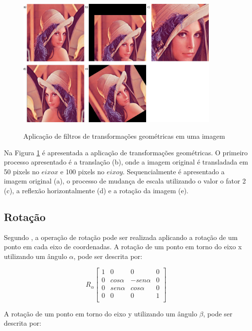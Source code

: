 \documentclass[
	12pt,				%
	oneside,			%
	a4paper,			%
	english,			%
	french,				%
	spanish,			%
	brazil,				%
	]{abntex2}
\begin{document}
\begin{figure}[ht]
\centering
\caption{Aplicação de filtros de transformações geométricas em uma imagem}
\includegraphics[width=0.9\textwidth]{imagens/transformacoesgeometricas.png}
\sourceAuthor
\label{fig:transformacoesgeometricas}
\end{figure}

Na Figura \ref{fig:transformacoesgeometricas} é apresentada a aplicação de transformações geométricas. O primeiro processo apresentado é a translação (b), onde a imagem original é transladada em 50 pixels no \(eixo x\) e 100 pixels no \(eixo y\). Sequencialmente é apresentado a imagem original (a), o processo de mudança de escala utilizando o valor o fator 2 (c), a reflexão horizontalmente (d) e a rotação da imagem (e). 

\subsection{Rotação}

Segundo \citet{pedriniSchwartz:2008}, a operação de rotação pode ser realizada aplicando a rotação de um ponto em cada eixo de coordenadas. A rotação de um ponto em torno do eixo x utilizando um ângulo \(\alpha\), pode ser descrita por:

\[
R_\alpha
\begin{bmatrix}
    1 &         0 &          0 & 0   \\ 
	0 & cos\alpha & -sen\alpha & 0   \\ 
	0 & sen\alpha &  cos\alpha & 0   \\ 
	0 &         0 &          0 & 1   \\ 
\end{bmatrix} 
\]

A rotação de um ponto em torno do eixo y utilizando um ângulo \(\beta\), pode ser descrita por:
\end{document}
